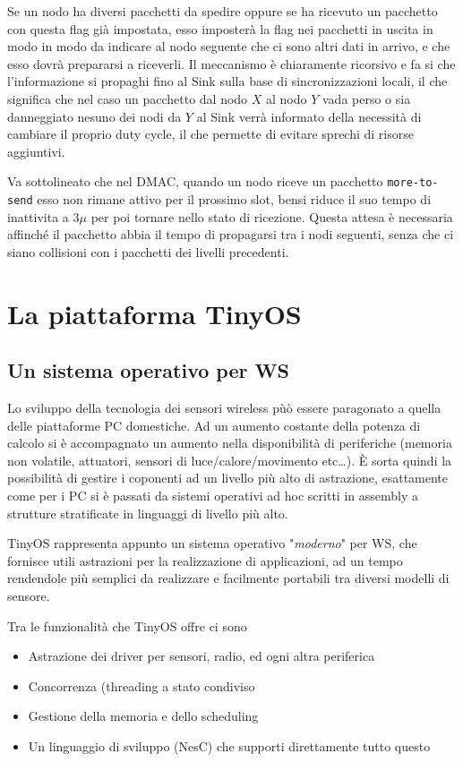 \documentclass[pdftex,11pt,a4paper,italian]{book}
\begin{document}
Se un nodo ha diversi pacchetti da spedire oppure se ha ricevuto un pacchetto con questa flag
già impostata, esso imposterà la flag nei pacchetti in uscita in modo in modo da indicare al 
nodo seguente che ci sono altri dati in arrivo, e che esso dovrà prepararsi a riceverli. 
Il meccanismo è chiaramente ricorsivo e fa si che l'informazione si propaghi fino al Sink 
sulla base di sincronizzazioni locali, il che significa che nel caso un pacchetto dal nodo $X$ 
al nodo $Y$ vada perso o sia danneggiato nesuno dei nodi da $Y$ al Sink verrà informato della necessità di  cambiare il proprio duty cycle, il che permette di evitare sprechi di risorse 
aggiuntivi.

Va sottolineato che nel DMAC, quando un nodo riceve un pacchetto \texttt{more-to-send} esso non 
rimane attivo per il prossimo slot, bensi riduce il suo tempo di inattivita a $3\mu$ per poi tornare nello stato di ricezione. Questa attesa è necessaria affinché il pacchetto abbia il tempo di propagarsi tra i nodi seguenti, senza che ci siano collisioni con i pacchetti dei livelli precedenti. 


\chapter{La piattaforma TinyOS}

\section{Un sistema operativo per WS}
Lo sviluppo della tecnologia dei sensori wireless pùò essere paragonato a quella delle 
piattaforme PC domestiche. Ad un aumento costante della potenza di calcolo si è accompagnato un 
aumento nella disponibilità di periferiche (memoria non volatile, attuatori, sensori di 
luce/calore/movimento etc\ldots). \`E sorta quindi la possibilità di gestire i coponenti ad un 
livello più alto di astrazione, esattamente come per i PC si è passati da sistemi operativi 
ad hoc scritti in assembly a strutture stratificate in linguaggi di livello più alto. 

TinyOS rappresenta appunto un sistema operativo "\emph{moderno}" per WS, che fornisce 
utili astrazioni per la realizzazione di applicazioni, ad un tempo rendendole più 
semplici da realizzare e facilmente portabili tra diversi modelli di sensore.

Tra le funzionalità che TinyOS offre ci sono
\begin{itemize}

\item{Astrazione dei driver per sensori, radio, ed ogni altra periferica  }

\item{Concorrenza (threading a stato condiviso}

\item{Gestione della memoria e dello scheduling}

\item{Un linguaggio di sviluppo (NesC) che supporti direttamente tutto questo}
\end{itemize}
\end{document}
